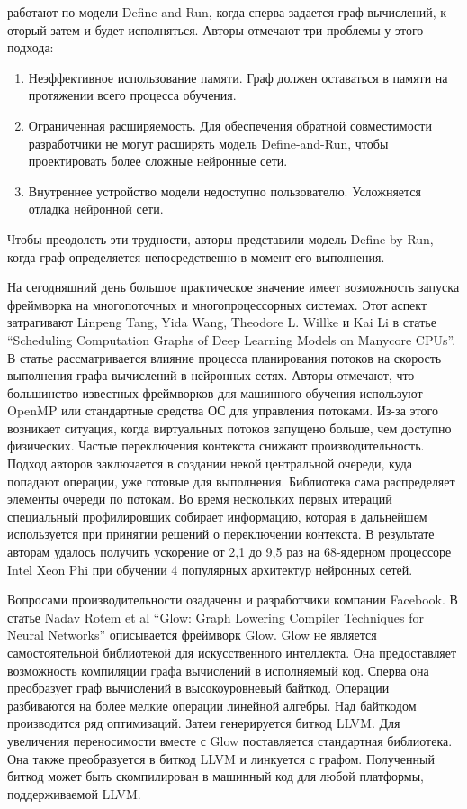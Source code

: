 работают по модели Define-and-Run, когда сперва задается граф вычислений, к
оторый затем и будет исполняться. Авторы отмечают три проблемы у этого подхода:
\begin{enumerate}
	\item Неэффективное использование памяти. Граф должен оставаться в памяти на протяжении всего процесса обучения.
	\item Ограниченная расширяемость. Для обеспечения обратной совместимости разработчики не могут расширять модель Define-and-Run, чтобы проектировать более сложные нейронные сети.
	\item Внутреннее устройство модели недоступно пользователю. Усложняется отладка нейронной сети.
\end{enumerate}
Чтобы преодолеть эти трудности, авторы представили модель Define-by-Run, когда
граф определяется непосредственно в момент его выполнения.
\par
На сегодняшний день большое практическое значение имеет возможность запуска
фреймворка на многопоточных и многопроцессорных системах. Этот аспект затрагивают
Linpeng Tang, Yida Wang, Theodore L. Willke и Kai Li в статье “Scheduling
Computation Graphs of Deep Learning Models on Manycore CPUs”\cite{Tang2018}.
В статье рассматривается влияние процесса планирования потоков на скорость
выполнения графа вычислений в нейронных сетях. Авторы отмечают, что большинство
известных фреймворков для машинного обучения используют OpenMP или стандартные
средства ОС для управления потоками. Из-за этого возникает ситуация, когда
виртуальных потоков запущено больше, чем доступно физических. Частые
переключения контекста снижают производительность. Подход авторов заключается
в создании некой центральной очереди, куда попадают операции, уже готовые для
выполнения. Библиотека сама распределяет элементы очереди по потокам. Во время
нескольких первых итераций специальный профилировщик собирает информацию,
которая в дальнейшем используется при принятии решений о переключении контекста.
В результате авторам удалось получить ускорение от 2,1 до 9,5 раз на 68-ядерном
процессоре Intel Xeon Phi при обучении 4 популярных архитектур нейронных сетей.
\par
Вопросами производительности озадачены и разработчики компании Facebook.
В статье Nadav Rotem et al “Glow: Graph Lowering Compiler Techniques for Neural
Networks”\cite{Rotem2018} описывается фреймворк Glow. Glow не является
самостоятельной библиотекой для искусственного интеллекта. Она предоставляет
возможность компиляции графа вычислений в исполняемый код. Сперва она
преобразует граф вычислений в высокоуровневый байткод. Операции разбиваются на
более мелкие операции линейной алгебры. Над байткодом производится ряд
оптимизаций. Затем генерируется биткод LLVM. Для увеличения переносимости вместе
с Glow поставляется стандартная библиотека. Она также преобразуется в биткод
LLVM и линкуется с графом. Полученный биткод может быть скомпилирован в машинный
код для любой платформы, поддерживаемой LLVM.
